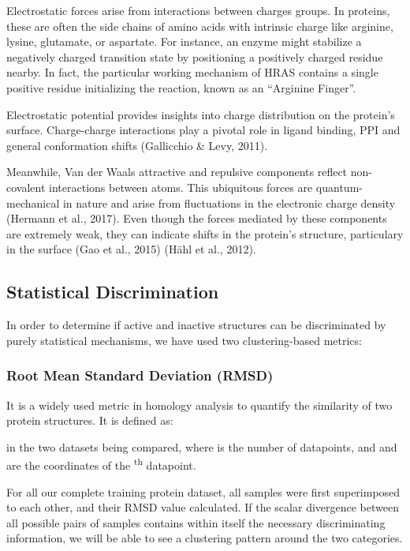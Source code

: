 \documentclass{article}
\begin{document}
Electrostatic forces arise from interactions between charges groups. In proteins, these are often the side chains of amino acids with intrinsic charge like arginine, lysine, glutamate, or aspartate. For instance, an enzyme might stabilize a negatively charged transition state by positioning a positively charged residue nearby. In fact, the particular working mechanism of HRAS contains a single positive residue initializing the reaction, known as an “Arginine Finger”.

Electrostatic potential provides insights into charge distribution on the protein’s surface. Charge-charge interactions play a pivotal role in ligand binding, PPI and general conformation shifts (Gallicchio \& Levy, 2011).

Meanwhile, Van der Waals attractive and repulsive components reflect non-covalent interactions between atoms. This ubiquitous forces are quantum-mechanical in nature and arise from fluctuations in the electronic charge density (Hermann et al., 2017). Even though the forces mediated by these components are extremely weak, they can indicate shifts in the protein’s structure, particulary in the surface (Gao et al., 2015) (Hähl et al., 2012).

\subsection{Statistical Discrimination}

In order to determine if active and inactive structures can be discriminated by purely statistical mechanisms, we have used two clustering-based metrics:

\subsubsection{Root Mean Standard Deviation (RMSD)}

It is a widely used metric in homology analysis to quantify the similarity of two protein structures. It is defined as:

in the two datasets being compared, where  is the number of datapoints, and  and are the coordinates of the \textsuperscript{th} datapoint.

For all our complete training protein dataset, all samples were first superimposed to each other, and their RMSD value calculated. If the scalar divergence between all possible pairs of samples contains within itself the necessary discriminating information, we will be able to see a clustering pattern around the two categories.
\end{document}

